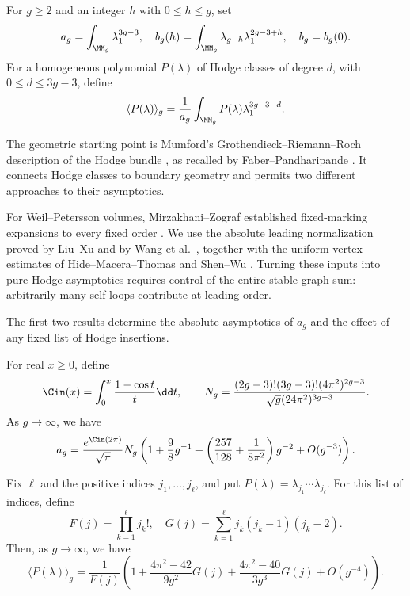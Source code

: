For $g\geq2$ and an integer $h$ with $0\leq h\leq g$, set
\[a_g=\int_{\MM_g}\lambda_1^{3g-3},\quad b_g(h)=\int_{\MM_g}\lambda_{g-h} \lambda_1^{2g-3+h},
\quad b_g=b_g(0).\]
For a homogeneous polynomial $P(\lambda)$ of Hodge classes of degree
$d$, with $0\leq d\leq3g-3$, define
\[\langle P(\lambda) \rangle_g=\frac{1}{a_g}\int_{\MM_g} P(\lambda)\lambda_1^{3g-3-d}.\]

The geometric starting point is Mumford's
Grothendieck--Riemann--Roch description of the Hodge bundle
\cite[\S 5]{Mum83}, as recalled by
Faber--Pandharipande \cite[\S 1.1]{FP00}. It connects Hodge classes
to boundary geometry and permits two different approaches to
their asymptotics.

For Weil--Petersson volumes, Mirzakhani--Zograf established
fixed-marking expansions to every fixed order
\cite[Theorem 1.2]{MZ15}. We use the absolute leading normalization
proved by Liu--Xu \cite[Corollary 1.2]{LX26} and by Wang et al.\
\cite[Corollary 1.2]{W26}, together with the uniform vertex
estimates of Hide--Macera--Thomas \cite[Theorem 4.2]{HMT25}
and Shen--Wu \cite[Lemmas 14 and 18]{SW25}.
Turning these inputs into pure Hodge asymptotics requires control
of the entire stable-graph sum: arbitrarily many self-loops
contribute at leading order.

The first two results determine the absolute asymptotics of $a_g$
and the effect of any fixed list of Hodge insertions.

\begin{thm}
\label{thm:lambda-one}
For real $x\geq0$, define
\[\Cin(x)=\int_0^x \frac{1-\cos t}{t}\dd t, \qquad
N_g=\frac{(2g-3)!(3g-3)!(4\pi^2)^{2g-3}}{\sqrt{g}(24\pi^2)^{3g-3}}.\]
As $g\to \infty$, we have
\begin{equation}
a_g=\frac{e^{\Cin(2\pi)}}{\sqrt{\pi}}N_g
\left(1+\frac{9}{8}g^{-1}+\left(\frac{257}{128}+\frac{1}{8\pi^2}\right)g^{-2}+O(g^{-3})\right).
\label{eq:111}
\end{equation}
\end{thm}

\begin{thm}
\label{thm:fixed-insertions}
Fix $\ell$ and the positive indices $j_1,\ldots,j_\ell$, and put
$P(\lambda)=\lambda_{j_1}\cdots\lambda_{j_\ell}$.  For this list of
indices, define
\[F(j)=\prod_{k=1}^\ell j_k!, \quad G(j)=\sum_{k=1}^\ell j_k(j_k-1)(j_k-2).\]
Then, as $g\to\infty$, we have
\begin{equation}
\langle P(\lambda) \rangle_g=\frac{1}{F(j)}\left(1+\frac{4\pi^2-42}{9g^2}G(j)+
\frac{4\pi^2-40}{3g^3}G(j)+O(g^{-4})\right).
\label{eq:P111}
\end{equation}
\end{thm}


